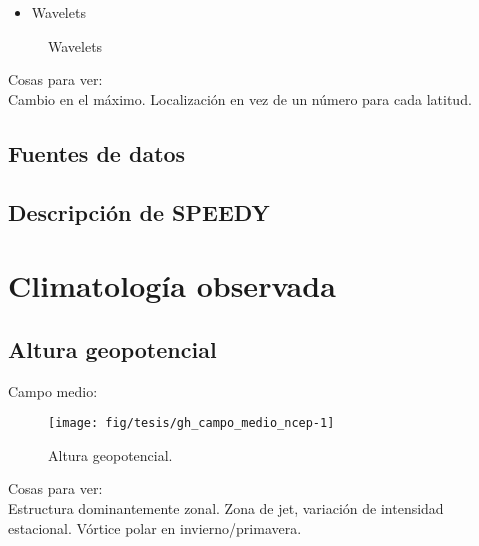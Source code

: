 \documentclass[spanish,a4paper]{book}
\providecommand{\tightlist}{%
  \setlength{\itemsep}{0pt}\setlength{\parskip}{0pt}}
\begin{document}
\begin{itemize}
\tightlist
\item
  Wavelets
\end{itemize}

\begin{figure*}
\caption{Wavelets}\label{fig:wavelet_ejemplo}
\end{figure*}

Cosas para ver:\\
Cambio en el máximo. Localización en vez de un número para cada latitud.

\section{Fuentes de datos}\label{fuentes-de-datos}

\section{Descripción de SPEEDY}\label{descripcion-de-speedy}

\chapter{Climatología observada}\label{climatologia-observada}

\section{Altura geopotencial}\label{altura-geopotencial}

Campo medio:

\begin{figure}

{\centering \texttt{[image: fig/tesis/gh\_campo\_medio\_ncep-1]} 

}

\caption{Altura geopotencial.}\label{fig:gh_campo_medio_ncep}
\end{figure}

Cosas para ver:\\
Estructura dominantemente zonal. Zona de jet, variación de intensidad
estacional. Vórtice polar en invierno/primavera.
\end{document}
